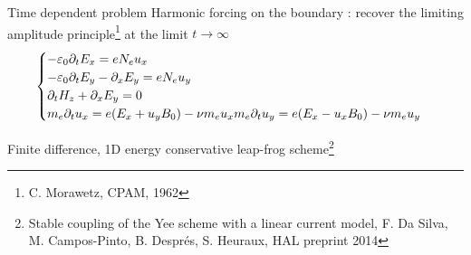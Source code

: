 \begin{frame}{Time dependent problem}
Harmonic forcing on the boundary : recover the limiting amplitude principle\footnote{C. Morawetz, CPAM, 1962} at the limit $t\rightarrow \infty$ 
\[
\begin{cases}
- \varepsilon_0 \partial_t E_x = e N_e u_x \\
- \varepsilon_0 \partial_t E_y - \partial_x E_y =  e N_e u_y \\
\partial_t H_z + \partial_x E_y = 0 \\
m_e \partial_t u_x = e (E_x + u_y B_0) - \nu m_e u_x
m_e \partial_t u_y = e (E_x - u_x B_0) - \nu m_e u_y
\end{cases}
\]

\alert{Finite difference, 1D energy conservative leap-frog scheme\footnote{ Stable coupling of the Yee scheme with a linear current model, F. Da Silva, M. Campos-Pinto, B. Després, S. Heuraux, HAL preprint 2014}}



\end{frame}
 {
\begin{frame}
\begin{center}
\textcolor{lightred}{}
\end{center}
\end{frame}}

